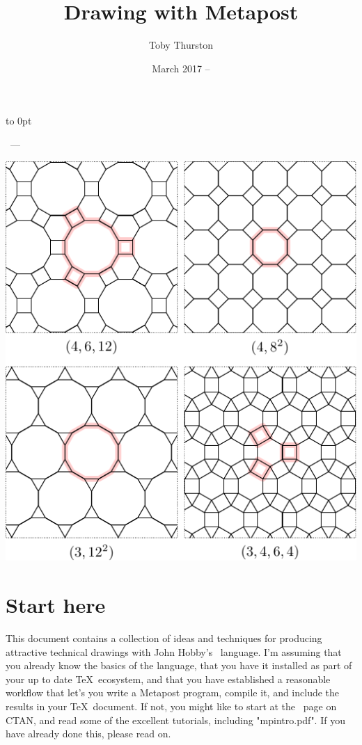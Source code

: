 \documentclass[a4paper,landscape]{article}
\title{Drawing with Metapost}
\author{Toby Thurston}
\date{March 2017 – }
\begin{document}
\let\folio\thepage
\renewcommand{\thepage}{\rlap{\hbox to 5in{\hss\small\folio}}}
\pagestyle{myheadings}
\raggedbottom
\makeatletter
\moveright 6in\vbox to
0pt{\vskip23pt\noindent\sffamily{\Large\bfseries\@title}\par\bigskip
    \noindent\@author\ --- \@date\par
    \bigskip\noindent
    \includegraphics{archimedes.pdf}
\vss}
\makeatother
\thispagestyle{empty}
\section{Start here}

This document contains a collection of ideas and techniques for producing attractive
technical drawings with John Hobby’s \MP\ language.  I’m assuming that you already
know the basics of the language, that you have it installed as part of your up to
date \TeX\ ecosystem, and that you have established a reasonable workflow that
let’s you write a Metapost program, compile it, and include the results in your
\TeX\ document.  If not, you might like to start at the \MP\ page on CTAN, and read
some of the excellent tutorials, including "mpintro.pdf".  If you have already done
this, please read on.
\end{document}
